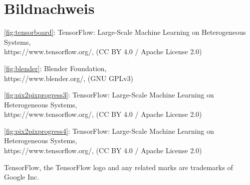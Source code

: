 \chapter*{Bildnachweis}

\autoref{fig:tensorboard}: {TensorFlow}: Large-Scale Machine Learning on Heterogeneous Systems,\\
https://www.tensorflow.org/, (CC BY 4.0 / Apache License 2.0)

\noindent
\autoref{fig:blender}: Blender Foundation,\\
https://www.blender.org/, (GNU GPLv3)

\noindent
\autoref{fig:pix2pixprogress3}: {TensorFlow}: Large-Scale Machine Learning on Heterogeneous Systems,\\
https://www.tensorflow.org/, (CC BY 4.0 / Apache License 2.0)

\noindent
\autoref{fig:pix2pixprogress4}: {TensorFlow}: Large-Scale Machine Learning on Heterogeneous Systems,\\
https://www.tensorflow.org/, (CC BY 4.0 / Apache License 2.0)

\noindent
TensorFlow, the TensorFlow logo and any related marks are trademarks of Google Inc.
